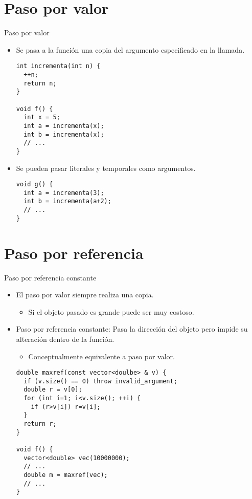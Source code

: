 \section{Paso por valor}

\begin{frame}[fragile]{Paso por valor}
\begin{itemize}
  \item Se pasa a la función una copia del argumento especificado en la llamada.
\begin{lstlisting}
int incrementa(int n) {
  ++n;
  return n;
}

void f() {
  int x = 5;
  int a = incrementa(x);
  int b = incrementa(x);
  // ...
}
\end{lstlisting}
  \item \pause Se pueden pasar literales y temporales como argumentos.
\begin{lstlisting}
void g() {
  int a = incrementa(3);
  int b = incrementa(a+2);
  // ...
}
\end{lstlisting}

\end{itemize}
\end{frame}

\section{Paso por referencia}

\begin{frame}[fragile]{Paso por referencia constante}
\begin{itemize}
  \item El paso por valor siempre realiza una copia.
    \begin{itemize}
      \item Si el objeto pasado es grande puede ser muy costoso.
    \end{itemize}
  \item \alert{Paso por referencia constante}: Pasa la dirección del objeto pero impide su alteración dentro de la función.
    \begin{itemize}
      \item Conceptualmente equivalente a paso por valor.
    \end{itemize}
\begin{lstlisting}
double maxref(const vector<doulbe> & v) {
  if (v.size() == 0) throw invalid_argument;
  double r = v[0];
  for (int i=1; i<v.size(); ++i) {
    if (r>v[i]) r=v[i];
  }
  return r;
}

void f() {
  vector<double> vec(10000000);
  // ...
  double m = maxref(vec);
  // ...
}
\end{lstlisting}
\end{itemize}
\end{frame}

